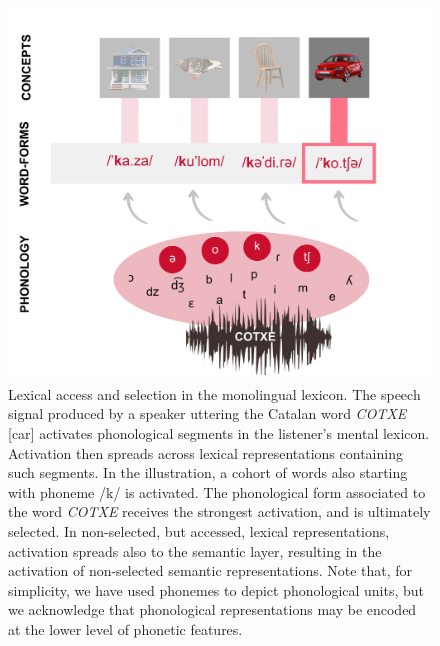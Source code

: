 \documentclass[
  12pt,
  b5paperpaper,
  twoside]{scrreprt}
\begin{document}
\begin{figure}

{\centering \includegraphics{chapters/../_assets/img/lexicon-mon.png}

}

\caption{\label{fig-lexicon-mon}Lexical access and selection in the
monolingual lexicon. The speech signal produced by a speaker uttering
the Catalan word \emph{COTXE} {[}car{]} activates phonological segments
in the listener's mental lexicon. Activation then spreads across lexical
representations containing such segments. In the illustration, a cohort
of words also starting with phoneme /k/ is activated. The phonological
form associated to the word \emph{COTXE} receives the strongest
activation, and is ultimately selected. In non-selected, but accessed,
lexical representations, activation spreads also to the semantic layer,
resulting in the activation of non-selected semantic representations.
Note that, for simplicity, we have used phonemes to depict phonological
units, but we acknowledge that phonological representations may be
encoded at the lower level of phonetic features.}

\end{figure}
\end{document}
